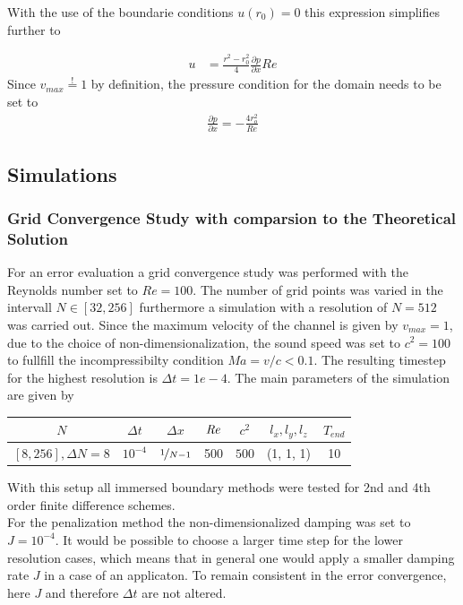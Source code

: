 \clearpage
With the use of the boundarie conditions $u(r_0) = 0$ this expression simplifies further to

\begin{align}
    u &= \frac{r^2 - r_0^2}{4}\frac{\partial p}{\partial x}Re
\end{align}
Since $v_{max} \stackrel{!}{=} 1$ by definition, the pressure condition for the domain needs to be set to
\begin{align}
    \frac{\partial p}{\partial x} = -\frac{4 r_o^2}{Re}
\end{align}

\subsection{Simulations}

\subsubsection{Grid Convergence Study with comparsion to the Theoretical Solution}

For an error evaluation a grid convergence study was performed with the Reynolds number set to $Re=100$.
The number of grid points was varied in the intervall $N\in[32, 256]$ furthermore a
simulation with a resolution of $N=512$ was carried out.
Since the maximum velocity of the channel is given by $v_{max}=1$, due to the choice of non-dimensionalization,
the sound speed was set to $c^2 = 100$ to fullfill the incompressibilty condition $Ma = v/c < 0.1$.
The resulting timestep for the highest resolution is $\Delta t = 1e-4$.
The main parameters of the simulation are  given by

\begin{center}
\vspace*{0.7ex}
\begin{tabular}{c|c|c|c|c|c|c }
 $ N  $                   & $\Delta t$ & $\Delta x$            & $\mbox{\textit{Re}}$  & $c^2$   & $l_x, l_y, l_z$ & $T_{end}$\\
\hline
 $[8, 256], \Delta N = 8 $& $10^{-4}$ & $\nicefrac{1}{N - 1}$ & 500     & $500$   & (1, 1, 1)       & 10\\
\end{tabular}
\vspace*{0.7ex}
\end{center}

With this setup all immersed boundary methods were tested for 2nd and 4th order finite difference schemes.\\
For the penalization method the non-dimensionalized damping was set to $J=10^{-4}$.
It would be possible to choose a larger time step for the lower resolution cases, which means that in general
one would apply a smaller damping rate $J$ in a case of an applicaton. To remain consistent in the error convergence, here $J$ and
therefore $\Delta t$ are not altered.

